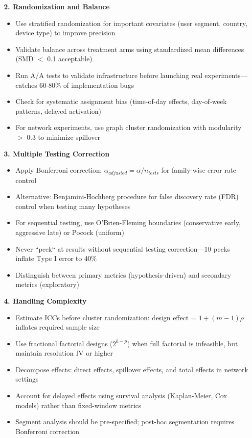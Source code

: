 \textbf{2. Randomization and Balance}
\begin{itemize}
    \item Use stratified randomization for important covariates (user segment, country, device type) to improve precision
    \item Validate balance across treatment arms using standardized mean differences (SMD $<$ 0.1 acceptable)
    \item Run A/A tests to validate infrastructure before launching real experiments---catches 60-80\% of implementation bugs
    \item Check for systematic assignment bias (time-of-day effects, day-of-week patterns, delayed activation)
    \item For network experiments, use graph cluster randomization with modularity $>$ 0.3 to minimize spillover
\end{itemize}

\textbf{3. Multiple Testing Correction}
\begin{itemize}
    \item Apply Bonferroni correction: $\alpha_{adjusted} = \alpha / n_{tests}$ for family-wise error rate control
    \item Alternative: Benjamini-Hochberg procedure for false discovery rate (FDR) control when testing many hypotheses
    \item For sequential testing, use O'Brien-Fleming boundaries (conservative early, aggressive late) or Pocock (uniform)
    \item Never ``peek`` at results without sequential testing correction---10 peeks inflate Type I error to 40\%
    \item Distinguish between primary metrics (hypothesis-driven) and secondary metrics (exploratory)
\end{itemize}

\textbf{4. Handling Complexity}
\begin{itemize}
    \item Estimate ICCs before cluster randomization: design effect = $1 + (m-1)\rho$ inflates required sample size
    \item Use fractional factorial designs ($2^{k-p}$) when full factorial is infeasible, but maintain resolution IV or higher
    \item Decompose effects: direct effects, spillover effects, and total effects in network settings
    \item Account for delayed effects using survival analysis (Kaplan-Meier, Cox models) rather than fixed-window metrics
    \item Segment analysis should be pre-specified; post-hoc segmentation requires Bonferroni correction
\end{itemize}

